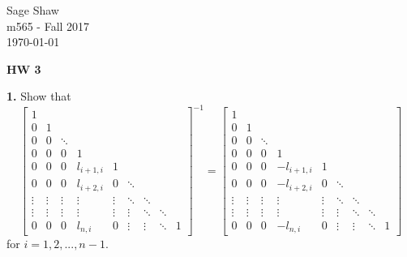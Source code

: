 \documentclass[12pt]{article}
\newcommand{\problem}[1]{\hspace{-4 ex} \large \textbf{#1}}
\begin{document}
	\thispagestyle{empty}
	
	\begin{flushright}
		Sage Shaw \\
		m565 - Fall 2017 \\
		\today
	\end{flushright}
	
{\large \textbf{HW 3}}\bigbreak

\singlespacing
\problem{1.} Show that 
	$$
	\begin{bmatrix}
		1\\
		0 & 1\\
		0 & 0 & \ddots\\
		0 & 0 & 0 & 1 \\
		0 & 0 & 0 & l_{i+1,i} & 1 \\
		0 & 0 & 0 & l_{i+2,i} & 0 & \ddots \\
		\vdots & \vdots & \vdots& \vdots& \vdots & \ddots & \ddots\\
		\vdots & \vdots & \vdots& \vdots& \vdots& \vdots & \ddots & \ddots\\
		0 & 0 & 0  & l_{n,i}  & 0 & \vdots & \vdots & \ddots & 1
	\end{bmatrix}^{-1}
	=
	\begin{bmatrix}
	1\\
	0 & 1\\
	0 & 0 & \ddots\\
	0 & 0 & 0 & 1 \\
	0 & 0 & 0 & -l_{i+1,i} & 1 \\
	0 & 0 & 0 & -l_{i+2,i} & 0 & \ddots \\
	\vdots & \vdots & \vdots& \vdots& \vdots & \ddots & \ddots\\
	\vdots & \vdots & \vdots& \vdots& \vdots& \vdots & \ddots & \ddots\\
	0 & 0 & 0  & -l_{n,i}  & 0 & \vdots & \vdots & \ddots & 1
	\end{bmatrix}
	$$
	for $i = 1, 2, ..., n-1$.
\end{document}
